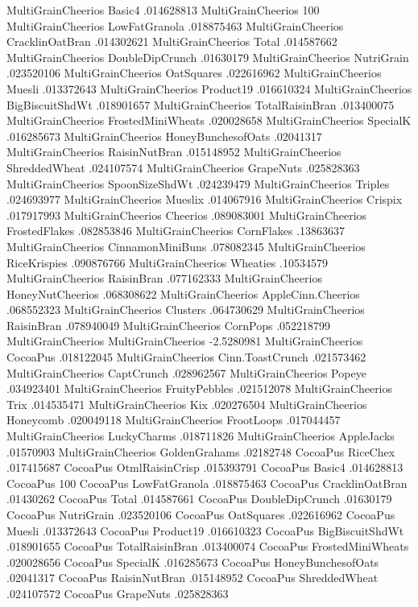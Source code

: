 MultiGrainCheerios	Basic4	.014628813
MultiGrainCheerios	100%
MultiGrainCheerios	LowFatGranola	.018875463
MultiGrainCheerios	CracklinOatBran	.014302621
MultiGrainCheerios	Total	.014587662
MultiGrainCheerios	DoubleDipCrunch	.01630179
MultiGrainCheerios	NutriGrain	.023520106
MultiGrainCheerios	OatSquares	.022616962
MultiGrainCheerios	Muesli	.013372643
MultiGrainCheerios	Product19	.016610324
MultiGrainCheerios	BigBiscuitShdWt	.018901657
MultiGrainCheerios	TotalRaisinBran	.013400075
MultiGrainCheerios	FrostedMiniWheats	.020028658
MultiGrainCheerios	SpecialK	.016285673
MultiGrainCheerios	HoneyBunchesofOats	.02041317
MultiGrainCheerios	RaisinNutBran	.015148952
MultiGrainCheerios	ShreddedWheat	.024107574
MultiGrainCheerios	GrapeNuts	.025828363
MultiGrainCheerios	SpoonSizeShdWt	.024239479
MultiGrainCheerios	Triples	.024693977
MultiGrainCheerios	Mueslix	.014067916
MultiGrainCheerios	Crispix	.017917993
MultiGrainCheerios	Cheerios	.089083001
MultiGrainCheerios	FrostedFlakes	.082853846
MultiGrainCheerios	CornFlakes	.13863637
MultiGrainCheerios	CinnamonMiniBuns	.078082345
MultiGrainCheerios	RiceKrispies	.090876766
MultiGrainCheerios	Wheaties	.10534579
MultiGrainCheerios	RaisinBran	.077162333
MultiGrainCheerios	HoneyNutCheerios	.068308622
MultiGrainCheerios	AppleCinn.Cheerios	.068552323
MultiGrainCheerios	Clusters	.064730629
MultiGrainCheerios	RaisinBran	.078940049
MultiGrainCheerios	CornPops	.052218799
MultiGrainCheerios	MultiGrainCheerios	-2.5280981
MultiGrainCheerios	CocoaPus	.018122045
MultiGrainCheerios	Cinn.ToastCrunch	.021573462
MultiGrainCheerios	CaptCrunch	.028962567
MultiGrainCheerios	Popeye	.034923401
MultiGrainCheerios	FruityPebbles	.021512078
MultiGrainCheerios	Trix	.014535471
MultiGrainCheerios	Kix	.020276504
MultiGrainCheerios	Honeycomb	.020049118
MultiGrainCheerios	FrootLoops	.017044457
MultiGrainCheerios	LuckyCharms	.018711826
MultiGrainCheerios	AppleJacks	.01570903
MultiGrainCheerios	GoldenGrahams	.02182748
CocoaPus	RiceChex	.017415687
CocoaPus	OtmlRaisinCrisp	.015393791
CocoaPus	Basic4	.014628813
CocoaPus	100%
CocoaPus	LowFatGranola	.018875463
CocoaPus	CracklinOatBran	.01430262
CocoaPus	Total	.014587661
CocoaPus	DoubleDipCrunch	.01630179
CocoaPus	NutriGrain	.023520106
CocoaPus	OatSquares	.022616962
CocoaPus	Muesli	.013372643
CocoaPus	Product19	.016610323
CocoaPus	BigBiscuitShdWt	.018901655
CocoaPus	TotalRaisinBran	.013400074
CocoaPus	FrostedMiniWheats	.020028656
CocoaPus	SpecialK	.016285673
CocoaPus	HoneyBunchesofOats	.02041317
CocoaPus	RaisinNutBran	.015148952
CocoaPus	ShreddedWheat	.024107572
CocoaPus	GrapeNuts	.025828363
